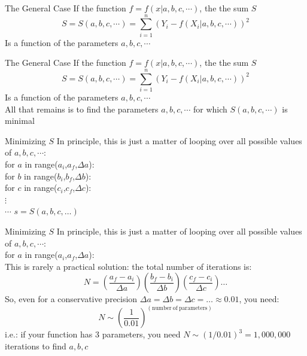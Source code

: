 \documentclass{beamer}
\begin{document}
\begin{frame}{The General Case}
	If the function $f=f(x|a,b,c,\cdots)$, the the sum $S$
	\begin{equation*}
		S=S(a,b,c,\cdots)=\sum_{i=1}^{n}\left(Y_i-f(X_i|a,b,c,\cdots)\right)^2
	\end{equation*}
	Is a function of the parameters $a,b,c,\cdots$ 
\end{frame}



\begin{frame}{The General Case}
	If the function $f=f(x|a,b,c,\cdots)$, the the sum $S$
	\begin{equation*}
		S=S(a,b,c,\cdots)=\sum_{i=1}^{n}\left(Y_i-f(X_i|a,b,c,\cdots)\right)^2
	\end{equation*}
	Is a function of the parameters $a,b,c,\cdots$ \\
	All that remains is to find the parameters $a,b,c,\cdots$ for which $S(a,b,c,\cdots)$ is minimal
\end{frame}



\begin{frame}{Minimizing $S$}
	In principle, this is just a matter of looping over all possible values of $a,b,c,\cdots$:\\
	for $a$ in range($a_i$,$a_f$,$\Delta a$):\\
	\hspace{.5cm}for $b$ in range($b_i$,$b_f$,$\Delta b$):\\
	\hspace{1cm}for $c$ in range($c_i$,$c_f$,$\Delta c$):\\
	\hspace{1.5cm}$\vdots$\\
	\hspace{2cm}$\cdots$ $s = S(a,b,c,\ldots)$
\end{frame}



\begin{frame}{Minimizing $S$}
	In principle, this is just a matter of looping over all possible values of $a,b,c,\cdots$:\\
	for $a$ in range($a_i$,$a_f$,$\Delta a$):\\
	
	This is rarely a practical solution: the total number of iterations is:
	\begin{equation*}
		N=\left(\frac{a_f-a_i}{\Delta a}\right)\left(\frac{b_f-b_i}{\Delta b}\right)\left(\frac{c_f-c_i}{\Delta c}\right)\ldots
	\end{equation*}
	So, even for a conservative precision $\Delta a=\Delta b=\Delta c=\ldots\approx 0.01$, you need:
	\begin{equation*}
		N\sim \left(\frac{1}{0.01}\right)^{(\mathrm{number\ of\ parameters})}
	\end{equation*}
i.e.: if your function has 3 parameters, you need $N\sim (1/0.01)^3=1,000,000$ iterations to find $a,b,c$
\end{frame}
\end{document}
